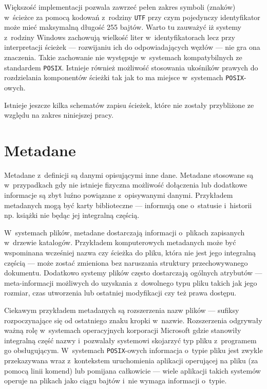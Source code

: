 \par
Większość implementacji pozwala zawrzeć pełen zakres symboli (znaków) w~ścieżce za pomocą kodowań z~rodziny \texttt{UTF} przy czym pojedynczy identyfikator może mieć maksymalną długość 255 bajtów.
Warto tu zauważyć iż systemy z~rodziny Windows zachowują wielkość liter w~identyfikatorach lecz przy interpretacji ścieżek --- rozwijaniu ich do odpowiadających węzłów --- nie gra ona znaczenia. Takie zachowanie nie występuje w~systemach kompatybilnych ze standardem \texttt{POSIX}. Istnieje również możliwość stosowania ukośników prawych do rozdzielania komponentów ścieżki tak jak to ma miejsce w~systemach \texttt{POSIX}-owych.

\par
Istnieje jeszcze kilka schematów zapisu ścieżek, które nie zostały przybliżone ze względu na zakres niniejszej pracy.

\clearpage

\section{Metadane}
\par
Metadane z~definicji są danymi opisującymi inne dane. Metadane stosowane są w~przypadkach gdy nie istnieje fizyczna możliwość dołączenia lub dodatkowe informacje są zbyt luźno powiązane z~opisywanymi danymi.
Przykładem metadanych mogą być karty biblioteczne --- informują one o~statusie i~historii np. książki nie będąc jej integralną częścią.

\par
 W~systemach plików, metadane dostarczają informacji o~plikach zapisanych w~drzewie katalogów.
Przykładem komputerowych metadanych może być wspominana wcześniej nazwa czy ścieżka do pliku, która nie jest jego integralną częścią --- może zostać zmieniona bez naruszania struktury przechowywanego dokumentu.
Dodatkowo systemy plików często dostarczają ogólnych atrybutów --- meta-informacji możliwych do uzyskania z~dowolnego typu pliku takich jak jego rozmiar, czas utworzenia lub ostatniej modyfikacji czy też prawa dostępu.
\par
Ciekawym przykładem metadanych są rozszerzenia nazw plików --- sufiksy rozpoczynające się od ostatniego znaku kropki w~nazwie. Rozszerzenia odgrywały ważną rolę w~systemach operacyjnych korporacji Microsoft gdzie stanowiły integralną część nazwy i~pozwalały systemowi skojarzyć typ pliku z~programem go obsługującym. W~systemach \texttt{POSIX}-owych informacja o~typie pliku jest zwykle przekazywana wraz z~kontekstem uruchomienia aplikacji operującej na pliku (za pomocą linii komend) lub pomijana całkowicie --- wiele aplikacji takich systemów operuje na plikach jako ciągu bajtów i~nie wymaga informacji o~typie.

